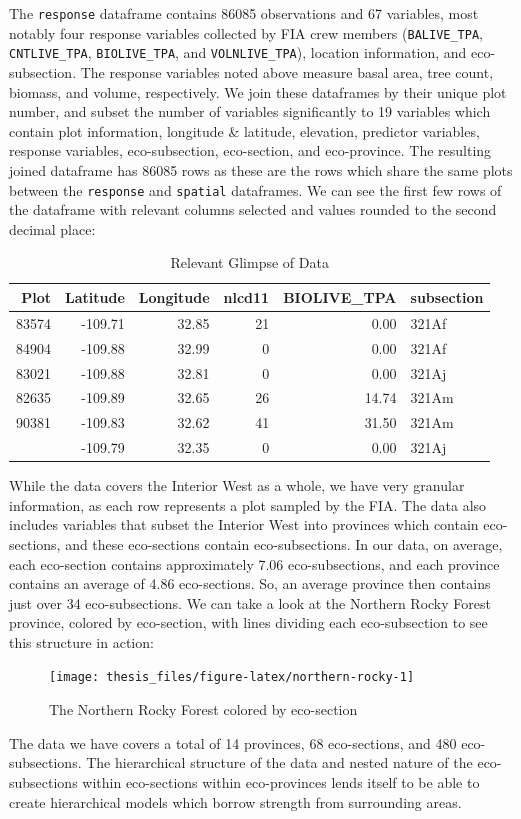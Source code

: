 \documentclass[12pt,twoside]{reedthesis}
\begin{document}
The \texttt{response} dataframe contains 86085 observations and 67 variables, most notably four response variables collected by FIA crew members (\texttt{BALIVE\_TPA}, \texttt{CNTLIVE\_TPA}, \texttt{BIOLIVE\_TPA}, and \texttt{VOLNLIVE\_TPA}), location information, and eco-subsection. The response variables noted above measure basal area, tree count, biomass, and volume, respectively. We join these dataframes by their unique plot number, and subset the number of variables significantly to 19 variables which contain plot information, longitude \& latitude, elevation, predictor variables, response variables, eco-subsection, eco-section, and eco-province. The resulting joined dataframe has 86085 rows as these are the rows which share the same plots between the \texttt{response} and \texttt{spatial} dataframes. We can see the first few rows of the dataframe with relevant columns selected and values rounded to the second decimal place:
\begin{longtable}[t]{rrrrrl}
\caption[Relevant Glimpse of Data]{\label{tab:unnamed-chunk-4}Relevant Glimpse of Data}\\
\toprule
Plot & Latitude & Longitude & nlcd11 & BIOLIVE\_TPA & subsection\\
\midrule
83574 & -109.71 & 32.85 & 21 & 0.00 & 321Af\\
84904 & -109.88 & 32.99 & 0 & 0.00 & 321Af\\
83021 & -109.88 & 32.81 & 0 & 0.00 & 321Aj\\
82635 & -109.89 & 32.65 & 26 & 14.74 & 321Am\\
90381 & -109.83 & 32.62 & 41 & 31.50 & 321Am\\
\addlinespace
81801 & -109.79 & 32.35 & 0 & 0.00 & 321Aj\\
\bottomrule
\end{longtable}
While the data covers the Interior West as a whole, we have very granular information, as each row represents a plot sampled by the FIA. The data also includes variables that subset the Interior West into provinces which contain eco-sections, and these eco-sections contain eco-subsections. In our data, on average, each eco-section contains approximately 7.06 eco-subsections, and each province contains an average of 4.86 eco-sections. So, an average province then contains just over 34 eco-subsections. We can take a look at the Northern Rocky Forest province, colored by eco-section, with lines dividing each eco-subsection to see this structure in action:
\begin{figure}

{\centering \texttt{[image: thesis\_files/figure-latex/northern-rocky-1]} 

}

\caption{The Northern Rocky Forest colored by eco-section}\label{fig:northern-rocky}
\end{figure}
The data we have covers a total of 14 provinces, 68 eco-sections, and 480 eco-subsections. The hierarchical structure of the data and nested nature of the eco-subsections within eco-sections within eco-provinces lends itself to be able to create hierarchical models which borrow strength from surrounding areas.
\end{document}
